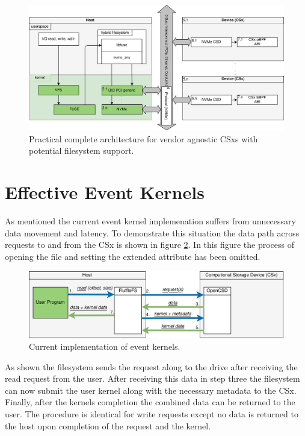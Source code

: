 \begin{figure}
    \centering
	\includegraphics[width=1\textwidth]{resources/images/loader-pfs-arch-v3.png}
	\caption{Practical complete architecture for vendor agnostic CSxs with
        potential filesystem support.}
    \label{figure:practicalarchitecture}
\end{figure}

\section{Effective Event Kernels}

As mentioned the current event kernel implemenation suffers from unnecessary
data movement and latency. To demonstrate this situation the data path across
requests to and from the CSx is shown in figure
\ref{figure:currenteventkernels}. In this figure the process of opening the file
and setting the extended attribute has been omitted.

\begin{figure}
    \centering
	\includegraphics[width=1\textwidth]{resources/images/current-event-kernel.png}
	\caption{Current implementation of event kernels.}
    \label{figure:currenteventkernels}
\end{figure}

As shown the filesystem sends the request along to the drive after receiving the
read request from the user. After receiving this data in step three the
filesystem can now submit the user kernel along with the necessary metadata to
the CSx. Finally, after the kernels completion the combined data can be returned
to the user. The procedure is identical for write requests except no data is
returned to the host upon completion of the request and the kernel.

